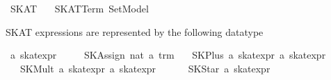 %
\begin{isabellebody}%
\def\isabellecontext{SKAT}%
%
\isadelimtheory
%
\endisadelimtheory
%
\isatagtheory
{}\isamarkupfalse%
\ SKAT\isanewline
\ \ \ SKAT{}Term\ Set{}Model\isanewline
{}%
\endisatagtheory
{\isafoldtheory}%
%
\isadelimtheory
%
\endisadelimtheory
%
\isamarkuptrue%
%
\isamarkuptrue%
%
\begin{isamarkuptext}%
SKAT expressions are represented by the following datatype%
\end{isamarkuptext}%
\isamarkuptrue%
\isamarkupfalse%
\ {}a\ skat{}expr\ {}\isanewline
\ \ \ \ SKAssign\ nat\ {}{}a\ trm{}\isanewline
\ \ {}\ SKPlus\ {}{}a\ skat{}expr{}\ {}{}a\ skat{}expr{}\ {}\ {}{}{}\ {}{}{}\isanewline
\ \ {}\ SKMult\ {}{}a\ skat{}expr{}\ {}{}a\ skat{}expr{}\ {}\ {}{}{}\ {}{}{}\isanewline
\ \ {}\ SKStar\ {}{}a\ skat{}expr{}\isanewline

\end{isabellebody}
